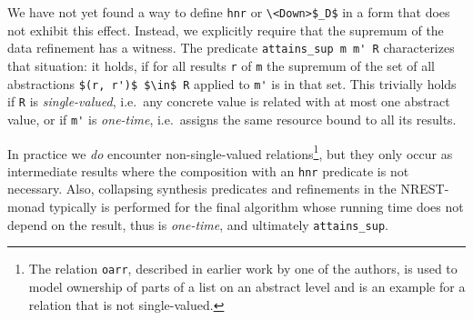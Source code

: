 \documentclass[acmsmall]{acmart}
\newcommand{\is}{\lstinline[language=isabelle]}
\begin{document}
We have not yet found a way to define \is{hnr} or \is{\<Down>$_D$} in a form that does not exhibit this effect.
Instead, we explicitly require that the supremum of the data refinement has a witness.
The predicate \is{attains_sup m m' R} characterizes that situation:
it holds, if for all results \is{r} of \is{m} the supremum of the set of all abstractions \is{$(r, r')$ $\in$ R} applied to \is{m'} is in that set. 
This trivially holds if \is{R} is \emph{single-valued}, i.e.\ any concrete value is related with at most one abstract value, or if \is{m'} is \emph{one-time}, i.e.\ assigns the same resource bound to all its results.

In practice 
we \emph{do} encounter non-single-valued relations\footnote{The relation \is{oarr}, described in earlier work \cite[4.2]{Lammich20} by one of the authors, is used to model ownership of parts of a list on an abstract level and is an example for a relation that is not single-valued.}, but they only occur as intermediate results where the composition with an \is{hnr} predicate is not necessary. 
Also, collapsing synthesis predicates and refinements in the NREST-monad typically is performed for the final algorithm whose running time does not depend on the result, thus is \emph{one-time}, and ultimately \is{attains_sup}.



















\end{document}
